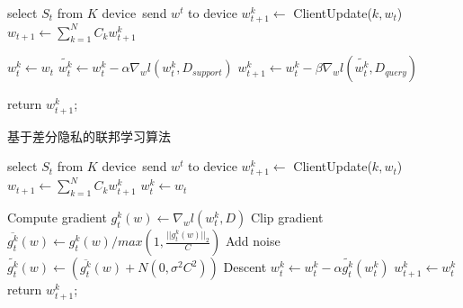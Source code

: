 \documentclass[11pt]{article}
\begin{document}
\begin{CJK*}{UTF8}{gkai}
\begin{algorithm}[H]
\begin{algorithmic}[1]
                \State select $S_t$ from $K$ device\
                \State send $w^t$ to device 
                    \State $w^k_{t+1} \gets $ ClientUpdate($k,w_t$)
                \EndFor
                \State $w_{t+1} \gets \sum_{k=1}^N C_k w_{t+1}^k$
            \EndFor
        \EndFunction

            \State $w_t^k \gets w_t$
                \State $\tilde{w_t^k} \gets w_t^k - \alpha\nabla_w l(w_t^k,D_{support})$
            \EndFor
            \State $w_{t+1}^k \gets w_t^k-\beta \nabla_w l(\tilde{w_t^k},D_{query})$
        \EndFunction

        \State return $w_{t+1}^k$;
    \end{algorithmic}  
    \end{algorithm}

        
    \begin{algorithm}[H]  
        \caption{基于差分隐私的联邦学习算法}  
        \begin{algorithmic}[1]%
        
                \State select $S_t$ from $K$ device\
                \State send $w^t$ to device 
                \For{client $k\in S_t$}
                    \State $w^k_{t+1} \gets $ ClientUpdate($k,w_t$)
                \EndFor
                \State $w_{t+1} \gets \sum_{k=1}^N C_k w_{t+1}^k$
            \EndFor
        \EndFunction    
            \State $w_t^k \gets w_t$
            
                \State Compute gradient $g_t^k(w) \gets \nabla_w l(w_t^k,D)$
                \State Clip gradient $\overline{g_t^k}(w) \gets g_t^k(w)/max(1,\frac{||g_t^k(w)||_2}{C})$
                \State Add noise $\tilde{g_t^k}(w)\gets (\overline{g_t^k}(w)+N(0,\sigma^2C^2))$
                \State Descent $w_t^k \gets w_t^k-\alpha \tilde{g_t^k}(w_t^k)$
            \EndFor
            \State $w_{t+1}^k\gets w_t^k$
            \State return $w_{t+1}^k$;
        \EndFunction
        

\end{algorithmic}
\end{algorithm}
\end{CJK*}
\end{document}
